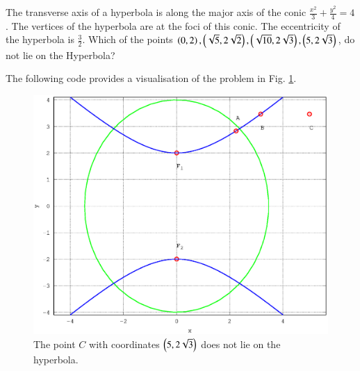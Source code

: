 \documentclass[journal,12pt,twocolumn]{IEEEtran}
\begin{document}
%
\begin{problem}
The transverse axis of a hyperbola is along the major axis of the conic $\frac{x^2}{3}+ \frac{y^2}{4} = 4$. The vertices of the hyperbola are at the foci of this conic. The eccentricity of the hyperbola is $\frac{3}{2}$. Which of the points $\left(0,2\right),\left(\sqrt{5},2\sqrt{2}\right),\left(\sqrt{10},2\sqrt{3}\right),\left(5, 2\sqrt{3}\right)$, do not lie on the Hyperbola?
\end{problem}
\solution

The following code provides a visualisation of the problem in Fig. \ref{fig_24}.

%
\begin{figure}[h]
\centering
\includegraphics[width=\columnwidth]{./version_2/ee16b1024/ee16b1024}
\caption{ The point $C$ with coordinates $\left(5, 2\sqrt{3}\right)$ does not lie on the hyperbola.}
\label{fig_24}	
\end{figure}
%
\end{document}
